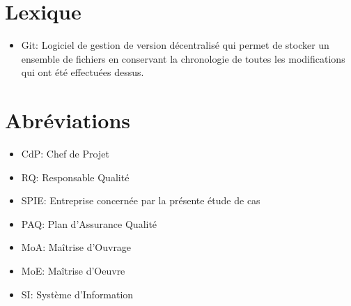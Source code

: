 \documentclass[a4paper, 18pt]{article}
\begin{document}
\section{Lexique}

\begin{itemize}
\item Git: Logiciel de gestion de version décentralisé qui permet de stocker un ensemble de fichiers en conservant la chronologie de toutes les modifications qui ont été effectuées dessus.
\end{itemize}

\section{Abréviations}

\begin{itemize}
\item CdP: Chef de Projet
\item RQ: Responsable Qualité
\item SPIE: Entreprise concernée par la présente étude de cas
\item PAQ: Plan d'Assurance Qualité
\item MoA: Maîtrise d'Ouvrage
\item MoE: Maîtrise d'Oeuvre
\item SI: Système d'Information
\end{itemize}
\end{document}
